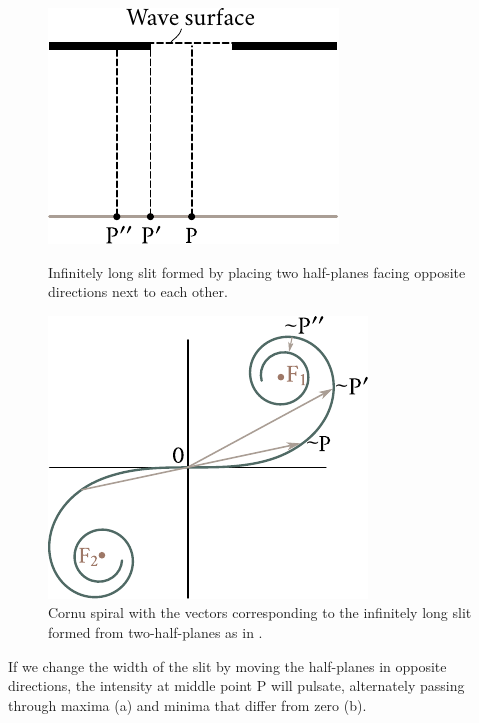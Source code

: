 \begin{figure}[t]
	\begin{minipage}[t]{0.48\linewidth}
		\begin{center}
			\includegraphics[scale=1]{figures/ch_18/fig_18_23.pdf}
            \caption[]{Infinitely long slit formed by placing two half-planes facing opposite directions next to each other.}
			\label{fig:18_23}
		\end{center}
	\end{minipage}
	\hfill{ }%
	\begin{minipage}[t]{0.48\linewidth}
		\begin{center}
			\includegraphics[scale=1]{figures/ch_18/fig_18_24.pdf}
			\caption[]{Cornu spiral with the vectors corresponding to the infinitely long slit formed from two-half-planes as in .}
			\label{fig:18_24}
		\end{center}
	\end{minipage}
\vspace{-0.4cm}
\end{figure}

If we change the width of the slit by moving the half-planes in opposite directions, the intensity at middle point P will pulsate, alternately passing through maxima (a) and minima that differ from zero (b).

